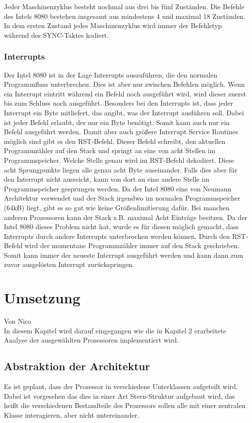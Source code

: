 \documentclass[12pt]{article}
\begin{document}
\noindent
Jeder Maschinenzyklus besteht nochmal aus drei bis fünf Zuständen. Die Befehle des Intels 8080 bestehen insgesamt aus mindestens 4 und maximal 18 Zuständen. In dem ersten Zustand jedes Maschinenzyklus wird immer der Befehlstyp während des SYNC-Taktes kodiert. \cite{IntMan16} 

\subsubsection{Interrupts}
Der Intel 8080 ist in der Lage Interrupts auszuführen, die den normalen Programmfluss unterbrechen. Dies ist aber nur zwischen Befehlen möglich. Wenn ein Interrupt eintritt während ein Befehl noch ausgeführt wird, wird dieser zuerst bis zum Schluss noch ausgeführt. Besonders bei den Interrupts ist, dass jeder Interrupt ein Byte mitliefert, das angibt, was der Interrupt ausführen soll. Dabei ist jeder Befehl erlaubt, der nur ein Byte benötigt. Somit kann auch nur ein Befehl ausgeführt werden. Damit aber auch größere Interrupt Service Routines möglich sind gibt es den RST-Befehl. Dieser Befehl schreibt, den aktuellen Programmzähler auf den Stack und springt an eine von acht Stellen im Programmspeicher. Welche Stelle genau wird im RST-Befehl dekodiert. Diese acht Sprungpunkte liegen alle genau acht Byte auseinander. Falls dies aber für den Interrupt nicht ausreicht, kann von dort an eine andere Stelle im Programmspeicher gesprungen werden. Da der Intel 8080 eine von Neumann Architektur verwendet und der Stack irgendwo im normalen Programmspeicher (64kB) liegt, gibt es so gut wie keine Größenlimitierung dafür. Bei manchen anderen Prozessoren kann der Stack z.B. maximal Acht Einträge besitzen. Da der Intel 8080 dieses Problem nicht hat, wurde es für diesen möglich gemacht, dass Interrupts durch andere Interrupts unterbrochen werden können. Durch den RST-Befehl wird der momentane Programmzähler immer auf den Stack geschrieben. Somit kann immer der neueste Interrupt ausgeführt werden und kann dann zum zuvor ausgelösten Interrupt zurückspringen.


\newpage

\section{Umsetzung}
Von Nico\\
\noindent
In diesem Kapitel wird darauf eingegangen wie die in Kapitel 2 erarbeitete Analyse der ausgewählten Prozessoren implementiert wird.

\subsection{Abstraktion der Architektur}
Es ist geplant, dass der Prozessor in verschiedene Unterklassen aufgeteilt wird. Dabei ist vorgesehen das dies in einer Art Stern-Struktur aufgebaut wird, das heißt die verschiedenen Bestandteile des Prozessors sollen alle mit einer zentralen Klasse interagieren, aber nicht untereinander.
\end{document}
